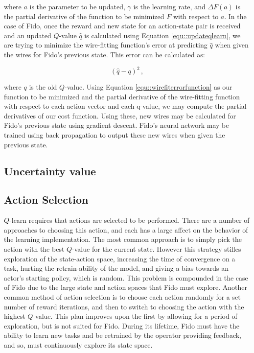 where $a$ is the parameter to be updated, $\gamma$ is the learning rate, and $\Delta F(a)$ is the partial derivative of the function to be minimized $F$ with respect to $a$.
In the case of Fido, once the reward and new state for an action-state pair is received and an updated $Q$-value $\hat{q}$ is calculated using Equation \ref{equ::updateqlearn}, we are trying to minimize the wire-fitting function's error at predicting $\hat{q}$ when given the wires for Fido's previous state.
This error can be calculated as:

\begin{equation}
	(\hat{q} - q)^2
	\,,
	\label{equ::wirefiterrorfunction}
\end{equation}

\noindent

where $q$ is the old $Q$-value.
Using Equation \ref{equ::wirefiterrorfunction} as our function to be minimized and the partial derivative of the wire-fitting function with respect to each action vector and each q-value, we may compute the partial derivatives of our cost function.
Using these, new wires may be calculated for Fido's previous state using gradient descent.
Fido's neural network may be trained using back propagation to output these new wires when given the previous state.

\subsection{Uncertainty value}

\subsection{Action Selection}

$Q$-learn requires that actions are selected to be performed.
There are a number of approaches to choosing this action, and each has a large affect on the behavior of the learning implementation.
The most common approach is to simply pick the action with the best $Q$-value for the current state.
However this strategy stifles exploration of the state-action space, increasing the time of convergence on a task, hurting the retrain-ability of the model, and giving a bias towards an actor's starting policy, which is random.
This problem is compounded in the case of Fido due to the large state and action spaces that Fido must explore.
Another common method of action selection is to choose each action randomly for a set number of reward iterations, and then to switch to choosing the action with the highest $Q$-value.
This plan improves upon the first by allowing for a period of exploration, but is not suited for Fido.
During its lifetime, Fido must have the ability to learn new tasks and be retrained by the operator providing feedback, and so, must continuously explore its state space.

